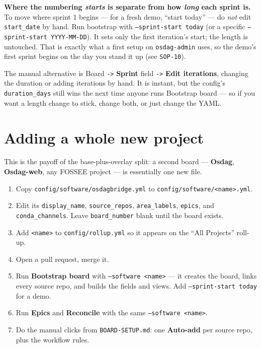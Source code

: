 \documentclass[11pt,a4paper]{report}
\newcommand{\code}[1]{\texttt{#1}}
\begin{document}
\begin{notebox}
\textbf{Where the numbering \emph{starts} is separate from how \emph{long} each
sprint is.} To move where sprint 1 begins --- for a fresh demo, ``start today''
--- do \emph{not} edit \code{start\_date} by hand. Run bootstrap with
\code{--sprint-start today} (or a specific \code{--sprint-start YYYY-MM-DD}). It
sets only the first iteration's start; the length is untouched. That is exactly
what a first setup on \code{osdag-admin} uses, so the demo's first sprint begins on
the day you stand it up (see \code{SOP-10}).
\end{notebox}

The manual alternative is Board \code{->} \textbf{Sprint} field \code{->}
\textbf{Edit iterations}, changing the duration or adding iterations by hand. It is
instant, but the config's \code{duration\_days} still wins the next time anyone runs
Bootstrap board --- so if you want a length change to stick, change both, or just
change the YAML.

\section{Adding a whole new project}

This is the payoff of the base-plus-overlay split: a second board ---
\textbf{Osdag}, \textbf{Osdag-web}, any FOSSEE project --- is essentially one new
file.

\begin{enumerate}[leftmargin=1.6em,itemsep=3pt]
  \item Copy \code{config/software/osdagbridge.yml} to
        \code{config/software/<name>.yml}.
  \item Edit its \code{display\_name}, \code{source\_repos}, \code{area\_labels},
        \code{epics}, and \code{conda\_channels}. Leave \code{board\_number} blank
        until the board exists.
  \item Add \code{<name>} to \code{config/rollup.yml} so it appears on the ``All
        Projects'' roll-up.
  \item Open a pull request, merge it.
  \item Run \textbf{Bootstrap board} with \code{--software <name>} --- it creates
        the board, links every source repo, and builds the fields and views. Add
        \code{--sprint-start today} for a demo.
  \item Run \textbf{Epics} and \textbf{Reconcile} with the same
        \code{--software <name>}.
  \item Do the manual clicks from \code{BOARD-SETUP.md}: one \textbf{Auto-add} per
        source repo, plus the workflow rules.
\end{enumerate}
\end{document}
